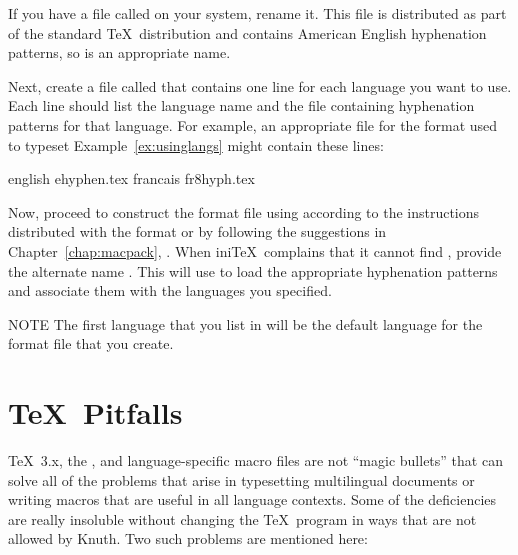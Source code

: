 If you have a file called  on your system, rename it.
This file is distributed as part of the standard \TeX\ distribution and
contains American English hyphenation patterns, so 
is an appropriate name.

Next, create a file called  that contains one line
for each language you want to use.  Each line should list the language
name and the file containing hyphenation patterns for that language.
For example, an appropriate  file for the format 
used to typeset Example~\ref{ex:usinglangs} might contain these lines:

\begin{ttindent}
english ehyphen.tex
francais fr8hyph.tex
\end{ttindent}

Now, proceed to construct the format file using  according to the 
instructions distributed with the format or by following the suggestions
in Chapter~\ref{chap:macpack}, \textit{}.  When
ini\TeX\ complains that it cannot find , provide the
alternate name .  This will use  to
load the appropriate hyphenation patterns and associate them with the
languages you specified.

\begin{note}{NOTE}
The first language that you list in  will be the
default language for the format file that you create.
\end{note}

\section{\protect\TeX\ Pitfalls}

\TeX\ 3.x, the , and language-specific macro files are not 
``magic bullets'' that can solve all of the problems that arise in typesetting
multilingual documents or writing macros that are useful in all language
contexts.
Some of the deficiencies are really insoluble without changing the \TeX\
program in ways that are not allowed by Knuth.  Two such problems are
mentioned here:

